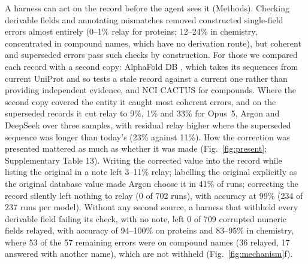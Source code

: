 A harness can act on the record before the agent sees it (Methods). Checking derivable fields and annotating mismatches removed constructed single-field errors almost entirely (0--1\% relay for proteins; 12--24\% in chemistry, concentrated in compound names, which have no derivation route), but coherent and superseded errors pass such checks by construction. For those we compared each record with a second copy: AlphaFold DB \cite{varadi2024alphafolddb,jumper2021alphafold}, which takes its sequences from current UniProt and so tests a stale record against a current one rather than providing independent evidence, and NCI CACTUS for compounds. Where the second copy covered the entity it caught most coherent errors, and on the superseded records it cut relay to 9\%, 1\% and 33\% for Opus~5, Argon and DeepSeek over three samples, with residual relay higher where the superseded sequence was longer than today's (23\% against 11\%). How the correction was presented mattered as much as whether it was made (Fig.~\ref{fig:present}; Supplementary Table 13). Writing the corrected value into the record while listing the original in a note left 3--11\% relay; labelling the original explicitly as the original database value made Argon choose it in 41\% of runs; correcting the record silently left nothing to relay (0 of 702 runs), with accuracy at 99\% (234 of 237 runs per model). Without any second source, a harness that withheld every derivable field failing its check, with no note, left 0 of 709 corrupted numeric fields relayed, with accuracy of 94--100\% on proteins and 83--95\% in chemistry, where 53 of the 57 remaining errors were on compound names (36 relayed, 17 answered with another name), which are not withheld (Fig.~\ref{fig:mechanism}f).

